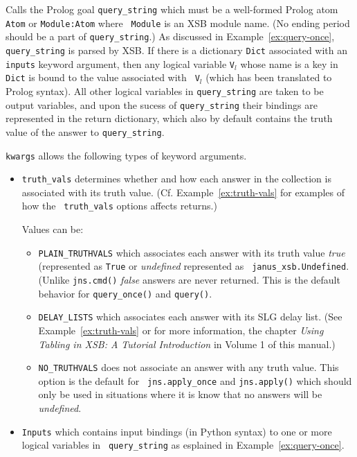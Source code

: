 \begin{description}
  Calls the Prolog goal {\tt query\_string} which must be a
  well-formed Prolog atom {\tt Atom} or {\tt Module:Atom} where {\tt
    Module} is an XSB module name.  (No ending period should be a part
  of {\tt query\_string}.)  As discussed in
  Example~\ref{ex:query-once}, {\tt query\_string} is parsed by XSB.
  If there is a dictionary {\tt Dict} associated with an {\tt inputs}
  keyword argument, then any logical variable {\tt V$_l$} whose name
  is a key in {\tt Dict} is bound to the value associated with {\tt
    V$_l$} (which has been translated to Prolog syntax).  All other
  logical variables in {\tt query\_string} are taken to be output
  variables, and upon the sucess of {\tt query\_string} their bindings
  are represented in the return dictionary, which also by default
  contains the truth value of the answer to {\tt query\_string}.

      {\tt kwargs} allows the following types of keyword arguments.
      \begin{itemize}
      \item {\tt truth\_vals} determines whether and how each answer
        in the collection is associated with its truth value.
        (Cf. Example~\ref{ex:truth-vals} for examples of how the {\tt
            truth\_vals} options affects returns.)

        Values can be:
        \begin{itemize}
        \item {\tt PLAIN\_TRUTHVALS} which associates each answer with
          its truth value {\em true} (represented as {\tt True} or
          {\em undefined} represented as {\tt
            janus\_xsb.Undefined}. (Unlike {\tt jns.cmd()}
        {\em false} answers are never returned.  This is the default
        behavior for {\tt query\_once()} and {\tt query()}.
      \item {\tt DELAY\_LISTS} which associates each answer with its
        SLG delay list. (See Example~\ref{ex:truth-vals} or for more
        information, the chapter {\em Using Tabling in XSB: A Tutorial
          Introduction} in Volume 1 of this manual.)

      \item {\tt NO\_TRUTHVALS} does not associate an answer with any
        truth value.  This option is the default for {\tt
          jns.apply\_once} and {\tt jns.apply()} which should only be
        used in situations where it is know that no answers will be
        {\em undefined}.
        \end{itemize}
      \item {\tt Inputs} which contains input bindings (in Python
        syntax) to one or more logical variables in {\tt
          query\_string} as esplained in Example~\ref{ex:query-once}.
      \end{itemize}


\end{description}
